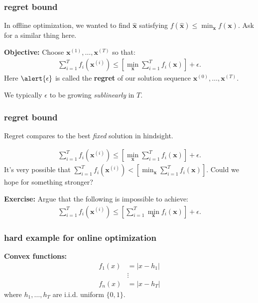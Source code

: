 \documentclass[compress]{beamer}
\newcommand{\bv}[1]{\mathbf{#1}}
\begin{document}
\begin{frame}[t]
	\frametitle{regret bound}
	In offline optimization, we wanted to find $\hat{\bv{x}}$ satisfying $f(\hat{\bv{x}}) \leq \min_{\bv{x}} f(\bv{x})$. Ask for a similar thing here. 
	
	\textbf{Objective:} Choose $\bv{x}^{(1)}, \ldots, \bv{x}^{(T)}$ so that: 
	\begin{align*}
		\sum_{i=1}^T f_i(\bv{x}^{(i)}) \leq \left[\min_\bv{x} \sum_{i=1}^T f_i(\bv{x})\right] + \epsilon.
	\end{align*}
	Here $\alert{\epsilon}$ is called the \alert{\textbf{regret}} of our solution sequence $\bv{x}^{(0)}, \ldots, \bv{x}^{(T)}$.
	
	We typically $\epsilon$ to be growing \emph{sublinearly} in $T$. 
\end{frame}

\begin{frame}[t]
	\frametitle{regret bound}
	\begin{center}
		Regret compares to the best \emph{fixed} solution in hindsight.
	\end{center}
	\begin{align*}
		\sum_{i=1}^T f_i(\bv{x}^{(i)}) \leq \left[\min_\bv{x} \sum_{i=1}^T f_i(\bv{x})\right] + \epsilon.
	\end{align*}
	It's very possible that $\sum_{i=1}^T f_i(\bv{x}^{(i)}) < \left[\min_\bv{x} \sum_{i=1}^T f_i(\bv{x})\right]$. Could we hope for something stronger?
	
	\textbf{Exercise:} Argue that the following is impossible to achieve:
	\begin{align*}
		\sum_{i=1}^T f_i(\bv{x}^{(i)}) \leq \left[\sum_{i=1}^T \min_\bv{x} f_i(\bv{x})\right] + \epsilon.
	\end{align*}
\end{frame}

\begin{frame}[t]
	\frametitle{hard example for online optimization}
	\textbf{Convex functions:}
	\begin{align*}
		f_1(x) &= |x - h_1|\\
		 &\vdots\\
		 f_n(x) &= |x - h_T|
	\end{align*}
where $h_1, \ldots, h_T$ are i.i.d. uniform $\{0,1\}$.
\end{frame}
\end{document}
